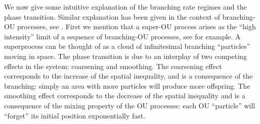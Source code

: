 \documentclass[EJP]{ejpecp} %
\begin{document}
	We now give some intuitive explanation of the branching rate regimes and the  phase transition.
	Similar explanation has been given in the context of branching-OU processes, see \cite{MarksMilos2018CLT}.
	First we mention that a super-OU process arises as the
	``high intensity'' limit of a sequence of branching-OU processes,
	see \cite{Li2011Measure-valued} for example. A superprocess can be thought of as a cloud of infinitesimal branching ``particles'' moving in space.
	The phase transition is due to an interplay of two competing effects in the system: coarsening and smoothing.
	The coarsening effect corresponds to the increase of the spatial inequality, and is a consequence of the branching: simply an area with more particles will produce more offspring.
	The smoothing effect corresponds to the decrease of the spatial inequality and is a consequence of the mixing property of the OU processes: each OU ``particle'' will ``forget'' its initial position exponentially fast.
\end{document}
